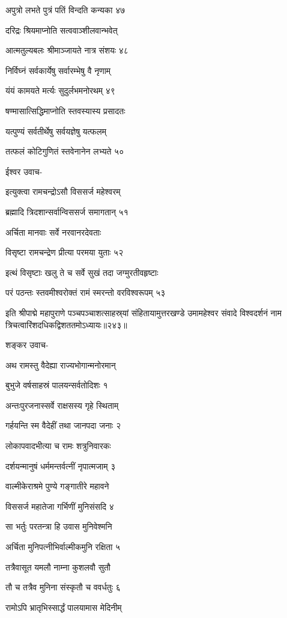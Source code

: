 अपुत्रो लभते पुत्रं पतिं विन्दति कन्यका ४७

दरिद्रः श्रियमाप्नोति सत्ववाञ्शीलवान्भवेत्

आत्मतुल्यबलः श्रीमाञ्जायते नात्र संशयः ४८

निर्विघ्नं सर्वकार्येषु सर्वारम्भेषु वै नृणाम्

यंयं कामयते मर्त्यः सुदुर्लभमनोरथम् ४९

षण्मासात्सिद्धिमाप्नोति स्तवस्यास्य प्रसादतः

यत्पुण्यं सर्वतीर्थेषु सर्वयज्ञेषु यत्फलम्

तत्फलं कोटिगुणितं स्तवेनानेन लभ्यते ५०

ईश्वर उवाच-

इत्युक्त्वा रामचन्द्रोऽसौ विससर्ज महेश्वरम्

ब्रह्मादि त्रिदशान्सर्वान्विससर्ज समागतान् ५१

अर्चिता मानवाः सर्वे नरवानरदेवताः

विसृष्टा रामचन्द्रेण प्रीत्या परमया युताः ५२

इत्थं विसृष्टाः खलु ते च सर्वे सुखं तदा जग्मुरतीवहृष्टाः

परं पठन्तः स्तवमीश्वरोक्तं रामं स्मरन्तो वरविश्वरूपम् ५३

इति श्रीपाद्मे महापुराणे पञ्चपञ्चाशत्साहस्र्यां संहितायामुत्तरखण्डे उमामहेश्वर संवादे विश्वदर्शनं नाम त्रिचत्वारिंशदधिकद्विशततमोऽध्यायः॥२४३॥


शङ्कर उवाच-

अथ रामस्तु वैदेह्या राज्यभोगान्मनोरमान्

बुभुजे वर्षसाहस्रं पालयन्सर्वतोदिशः १

अन्तःपुरजनास्सर्वे राक्षसस्य गृहे स्थिताम्

गर्हयन्ति स्म वैदेहीं तथा जानपदा जनाः २

लोकापवादभीत्या च रामः शत्रुनिवारकः

दर्शयन्मानुषं धर्ममन्तर्वत्नीं नृपात्मजाम् ३

वाल्मीकेराश्रमे पुण्ये गङ्गातीरे महावने

विससर्ज महातेजा गर्भिणीं मुनिसंसदि ४

सा भर्तुः परतन्त्रा हि उवास मुनिवेश्मनि

अर्चिता मुनिपत्नीभिर्वाल्मीकमुनि रक्षिता ५

तत्रैवासूत यमलौ नाम्ना कुशलवौ सुतौ

तौ च तत्रैव मुनिना संस्कृतौ च ववर्धतुः ६

रामोऽपि भ्रातृभिस्सार्द्धं पालयामास मेदिनीम्

